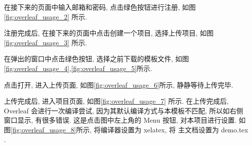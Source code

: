 \documentclass[bibsec, doctor, tabtoc]{cugthesis}
\begin{document}
在接下来的页面中输入邮箱和密码, 点击绿色按钮进行注册,
如图\ref{fig:overleaf_usage_2} 所示.


注册完成后, 在接下来的页面中点击创建一个项目, 选择上传项目,
如图\ref{fig:overleaf_usage_3} 所示.


在弹出的窗口中点击绿色按钮, 选择之前下载的模板文件,
如图\ref{fig:overleaf_usage_4},\ref{fig:overleaf_usage_5}所示.



点击打开, 进入上传页面, 如图\ref{fig:overleaf_usage_6}所示, 静静等待上传完毕.


上传完成后, 进入项目页面, 如图\ref{fig:overleaf_usage_7} 所示. 在上传完成后,
Overleaf 会进行一次编译尝试, 因为其默认编译方式与本模板不匹配,
所以如右侧窗口显示, 有很多错误. 这是点击图中左上角的 Menu 按钮,
对本项目进行设置. 如图\ref{fig:overleaf_usage_8}所示, 将编译器设置为 xelatex, 将
主文档设置为 demo.tex .


\end{document}

